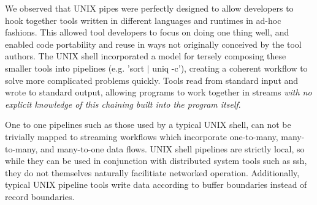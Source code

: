 We observed that UNIX pipes were perfectly designed to allow 
developers to hook together tools written
in different languages and runtimes in ad-hoc fashions.  
This allowed
tool developers to focus on doing one thing well, and enabled code
portability and reuse in ways not originally conceived by the tool
authors.  The UNIX shell incorporated a model for tersely composing
these smaller tools into pipelines (e.g. 'sort $|$ uniq -c'), 
creating a
coherent workflow to solve more complicated problems quickly.  Tools
read from standard input and wrote to standard output, allowing
programs to work together in streams \emph{with no explicit knowledge
of this chaining built into the program itself}.

One to one pipelines such as those used by a typical UNIX shell,
can not be trivially mapped to streaming workflows which incorporate
one-to-many, many-to-many, and many-to-one data flows.  
UNIX shell pipelines are strictly local, so while they can be used in
conjunction with distributed system tools such as ssh, they do not 
themselves naturally facilitiate networked operation.
Additionally,
typical UNIX pipeline tools write data according to buffer boundaries
instead of record boundaries.  

